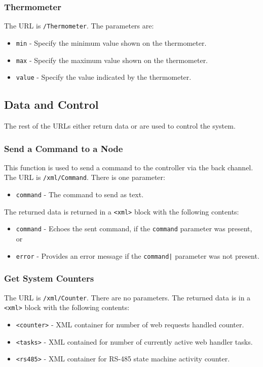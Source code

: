 \documentclass[10pt, openany, draft]{article}
\begin{document}
\subsubsection{Thermometer}
The URL is \texttt{/Thermometer}.  The parameters are:
\begin{itemize}
  \item \texttt{min} - Specify the minimum value shown on the thermometer.
  \item \texttt{max} - Specify the maximum value shown on the thermometer.
  \item \texttt{value} - Specify the value indicated by the thermometer.
\end{itemize}

\subsection{Data and Control}
The rest of the URLs either return data or are used to control the system.

\subsubsection{Send a Command to a Node}
This function is used to send a command to the controller via the back channel.  The URL is \texttt{/xml/Command}.  There is one parameter:
\begin{itemize}
  \item \texttt{command} - The command to send as text.
\end{itemize}

The returned data is returned in a \texttt{<xml>} block with the following contents:
\begin{itemize}
  \item \texttt{command} - Echoes the sent command, if the \texttt{command} parameter was present, or
  \item \texttt{error} - Provides an error message if the \texttt{command|} parameter was not present.
\end{itemize}

\subsubsection{Get System Counters}
The URL is \texttt{/xml/Counter}.  There are no parameters.  The returned data is in a \texttt{<xml>} block with the following contents:
\begin{itemize}
  \item \texttt{<counter>} - XML container for number of web requests handled counter.
  \item \texttt{<tasks>} - XML contained for number of currently active web handler tasks.
  \item \texttt{<rs485>} - XML container for RS-485 state machine activity counter.
\end{itemize}
\end{document}
